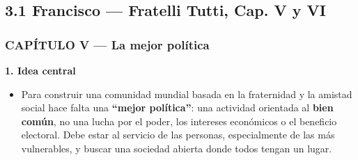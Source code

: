 \documentclass[10pt,a4paper]{article}
\begin{document}
\subsection{3.1 Francisco --- Fratelli Tutti, Cap. V y VI}

\subsubsection{CAPÍTULO V --- La mejor política}

\medskip\noindent \textbf{1. Idea central}\par\nopagebreak
\begin{itemize}
\item Para construir una comunidad mundial basada en la fraternidad y la amistad social hace falta una \textbf{``mejor política''}: una actividad orientada al \textbf{bien común}, no una lucha por el poder, los intereses económicos o el beneficio electoral. Debe estar al servicio de las personas, especialmente de las más vulnerables, y buscar una sociedad abierta donde todos tengan un lugar.
\end{itemize}
\end{document}
